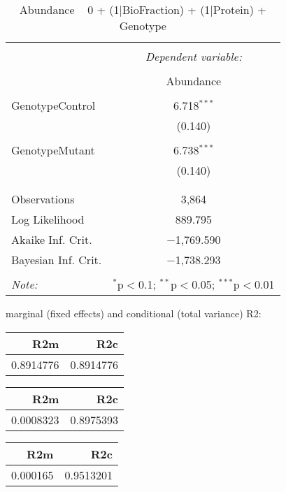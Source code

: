 \documentclass[11pt]{report}
\begin{document}
\begin{table}[!htbp] \centering 
  \caption{Abundance ~ 0 + (1|BioFraction) + (1|Protein) + Genotype} 
  \label{} 
\begin{tabular}{@{\extracolsep{5pt}}lc} 
\\[-1.8ex]\hline 
\hline \\[-1.8ex] 
 & \multicolumn{1}{c}{\textit{Dependent variable:}} \\ 
\cline{2-2} 
\\[-1.8ex] & Abundance \\ 
\hline \\[-1.8ex] 
 GenotypeControl & 6.718$^{***}$ \\ 
  & (0.140) \\ 
  & \\ 
 GenotypeMutant & 6.738$^{***}$ \\ 
  & (0.140) \\ 
  & \\ 
\hline \\[-1.8ex] 
Observations & 3,864 \\ 
Log Likelihood & 889.795 \\ 
Akaike Inf. Crit. & $-$1,769.590 \\ 
Bayesian Inf. Crit. & $-$1,738.293 \\ 
\hline 
\hline \\[-1.8ex] 
\textit{Note:}  & \multicolumn{1}{r}{$^{*}$p$<$0.1; $^{**}$p$<$0.05; $^{***}$p$<$0.01} \\ 
\end{tabular} 
\end{table} 
marginal (fixed effects) and conditional (total variance) R2:

\begin{tabular}{r|r}
\hline
R2m & R2c\\
\hline
0.8914776 & 0.8914776\\
\hline
\end{tabular}

\begin{tabular}{r|r}
\hline
R2m & R2c\\
\hline
0.0008323 & 0.8975393\\
\hline
\end{tabular}

\begin{tabular}{r|r}
\hline
R2m & R2c\\
\hline
0.000165 & 0.9513201\\
\hline
\end{tabular}
\end{document}
